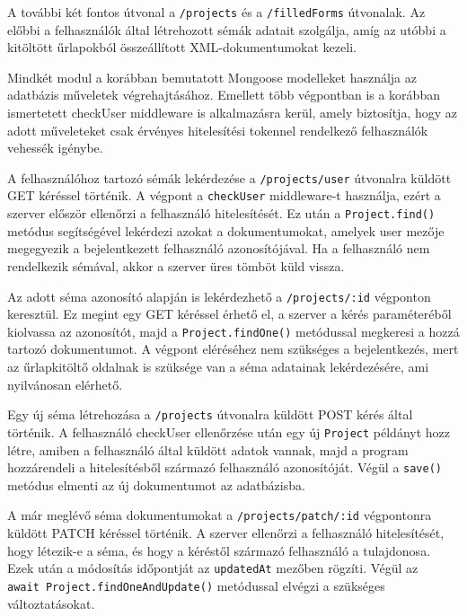 
A további két fontos útvonal a \texttt{/projects} és a \texttt{/filledForms} útvonalak. Az előbbi a felhasználók által létrehozott sémák adatait szolgálja, amíg az utóbbi a kitöltött űrlapokból összeállított XML-dokumentumokat kezeli.

Mindkét modul a korábban bemutatott Mongoose modelleket használja az adatbázis műveletek végrehajtásához. Emellett több végpontban is a korábban ismertetett checkUser middleware is alkalmazásra kerül, amely biztosítja, hogy az adott műveleteket csak érvényes hitelesítési tokennel rendelkező felhasználók vehessék igénybe. 



A felhasználóhoz tartozó sémák lekérdezése a \texttt{/projects/user} útvonalra küldött  GET kéréssel történik. A végpont a \texttt{checkUser} middleware-t használja, ezért a szerver először ellenőrzi a felhasználó hitelesítését. Ez után a \texttt{Project.find()} metódus segítségével lekérdezi azokat a dokumentumokat, amelyek user mezője megegyezik a bejelentkezett felhasználó azonosítójával. Ha a felhasználó nem rendelkezik sémával, akkor a szerver üres tömböt küld vissza.


Az adott séma azonosító alapján is lekérdezhető a \texttt{/projects/:id} végponton keresztül. Ez megint egy GET kéréssel érhető el, a szerver a kérés paraméteréből kiolvassa az azonosítót, majd a \texttt{Project.findOne()} metódussal megkeresi a hozzá tartozó dokumentumot. A végpont eléréséhez nem szükséges a bejelentkezés, mert az űrlapkitöltő oldalnak is szüksége van a séma adatainak lekérdezésére, ami nyilvánosan elérhető.


Egy új séma létrehozása a \texttt{/projects} útvonalra küldött POST kérés által történik. A felhasználó checkUser ellenőrzése után egy új \texttt{Project} példányt hozz létre, amiben a felhasználó által küldött adatok vannak, majd a program hozzárendeli a hitelesítésből származó felhasználó azonosítóját. Végül a \texttt{save()} metódus elmenti az új dokumentumot az adatbázisba.


A már meglévő séma dokumentumokat a \texttt{/projects/patch/:id} végpontonra küldött PATCH kéréssel történik. A szerver ellenőrzi a felhasználó hitelesítését, hogy létezik-e a séma, és hogy a kéréstől származó felhasználó a tulajdonosa. Ezek után a módosítás időpontját az \texttt{updatedAt} mezőben rögzíti. Végül az \\ \texttt{await Project.findOneAndUpdate()} metódussal elvégzi a szükséges változtatásokat.

